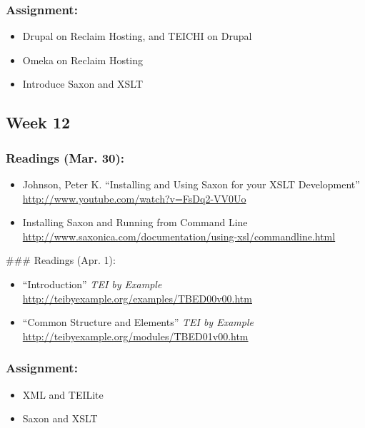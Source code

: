 \documentclass[]{article}
\begin{document}
\subsubsection{Assignment:}\label{assignment-9}

\begin{itemize}
\itemsep1pt\parskip0pt
\item
  Drupal on Reclaim Hosting, and TEICHI on Drupal
\item
  Omeka on Reclaim Hosting
\item
  Introduce Saxon and XSLT
\end{itemize}

\subsection{Week 12}\label{week-12}

\subsubsection{Readings (Mar. 30):}\label{readings-mar.-30}

\begin{itemize}
\itemsep1pt\parskip0pt
\item
  Johnson, Peter K. ``Installing and Using Saxon for your XSLT
  Development'' \url{http://www.youtube.com/watch?v=FsDq2-VV0Uo}
\item
  Installing Saxon and Running from Command Line
  \url{http://www.saxonica.com/documentation/using-xsl/commandline.html}
\end{itemize}

\#\#\# Readings (Apr. 1):

\begin{itemize}
\itemsep1pt\parskip0pt
\item
  ``Introduction'' \emph{TEI by Example}
  \url{http://teibyexample.org/examples/TBED00v00.htm}
\item
  ``Common Structure and Elements'' \emph{TEI by Example}
  \url{http://teibyexample.org/modules/TBED01v00.htm}
\end{itemize}

\subsubsection{Assignment:}\label{assignment-10}

\begin{itemize}
\itemsep1pt\parskip0pt
\item
  XML and TEILite
\item
  Saxon and XSLT
\end{itemize}
\end{document}
